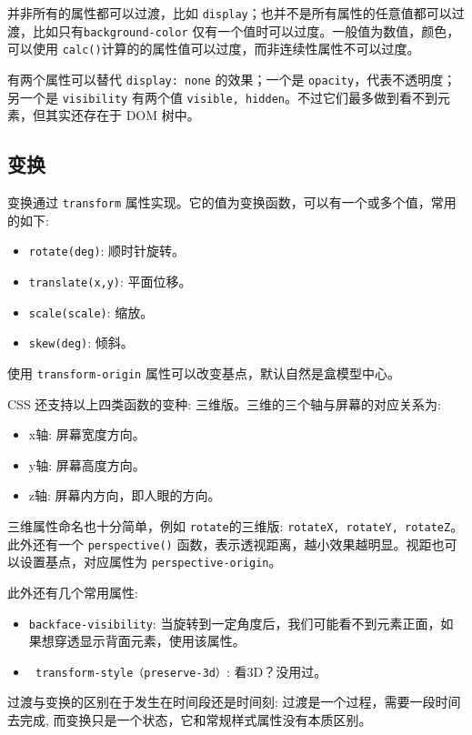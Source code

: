并非所有的属性都可以过渡，比如 \texttt{display}；也并不是所有属性的任意值都可以过渡，比如只有\texttt{background-color} 仅有一个值时可以过度。一般值为数值，颜色，可以使用 \texttt{calc()}计算的的属性值可以过度，而非连续性属性不可以过度。

有两个属性可以替代 \texttt{display: none} 的效果；一个是 \texttt{opacity}，代表不透明度；另一个是 \texttt{visibility} 有两个值 \texttt{visible, hidden}。不过它们最多做到看不到元素，但其实还存在于 DOM 树中。 

\subsection{变换}

变换通过 \texttt{transform} 属性实现。它的值为变换函数，可以有一个或多个值，常用的如下:
\begin{itemize}
    \item \texttt{rotate(deg)}: 顺时针旋转。
    \item \texttt{translate(x,y)}: 平面位移。 
    \item \texttt{scale(scale)}: 缩放。
    \item \texttt{skew(deg)}: 倾斜。
\end{itemize}

使用 \texttt{transform-origin} 属性可以改变基点，默认自然是盒模型中心。

CSS 还支持以上四类函数的变种: 三维版。三维的三个轴与屏幕的对应关系为: 
\begin{itemize}
    \item x轴: 屏幕宽度方向。
    \item y轴: 屏幕高度方向。
    \item z轴: 屏幕内方向，即人眼的方向。
\end{itemize}

三维属性命名也十分简单，例如 \texttt{rotate}的三维版: \texttt{rotateX, rotateY, rotateZ}。此外还有一个 \texttt{perspective()} 函数，表示透视距离，越小效果越明显。视距也可以设置基点，对应属性为 \texttt{perspective-origin}。

此外还有几个常用属性:
\begin{itemize}
    \item \texttt{backface-visibility}: 当旋转到一定角度后，我们可能看不到元素正面，如果想穿透显示背面元素，使用该属性。
    \item \texttt{ transform-style（preserve-3d）}: 看3D？没用过。
\end{itemize}

过渡与变换的区别在于发生在时间段还是时间刻: 过渡是一个过程，需要一段时间去完成, 而变换只是一个状态，它和常规样式属性没有本质区别。

\newpage